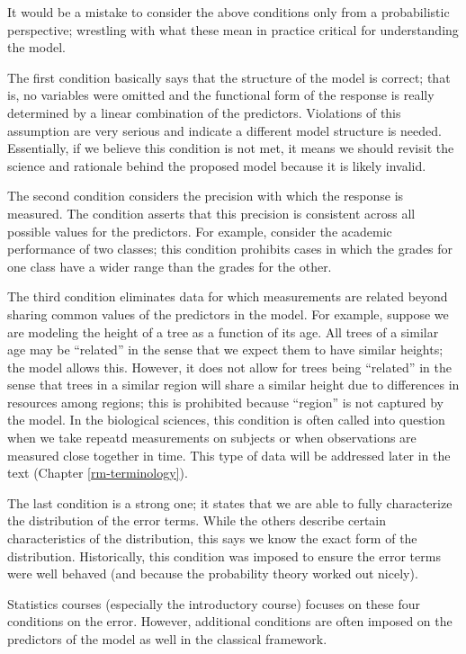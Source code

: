 \documentclass[
]{book}
\theoremstyle{plain}
\theoremstyle{mydefn}
\theoremstyle{myexmpl}
\theoremstyle{remark}
\begin{document}
It would be a mistake to consider the above conditions only from a probabilistic perspective; wrestling with what these mean in practice critical for understanding the model.

The first condition basically says that the structure of the model is correct; that is, no variables were omitted and the functional form of the response is really determined by a linear combination of the predictors. Violations of this assumption are very serious and indicate a different model structure is needed. Essentially, if we believe this condition is not met, it means we should revisit the science and rationale behind the proposed model because it is likely invalid.

The second condition considers the precision with which the response is measured. The condition asserts that this precision is consistent across all possible values for the predictors. For example, consider the academic performance of two classes; this condition prohibits cases in which the grades for one class have a wider range than the grades for the other.

The third condition eliminates data for which measurements are related beyond sharing common values of the predictors in the model. For example, suppose we are modeling the height of a tree as a function of its age. All trees of a similar age may be ``related'' in the sense that we expect them to have similar heights; the model allows this. However, it does not allow for trees being ``related'' in the sense that trees in a similar region will share a similar height due to differences in resources among regions; this is prohibited because ``region'' is not captured by the model. In the biological sciences, this condition is often called into question when we take repeatd measurements on subjects or when observations are measured close together in time. This type of data will be addressed later in the text (Chapter \ref{rm-terminology}).

The last condition is a strong one; it states that we are able to fully characterize the distribution of the error terms. While the others describe certain characteristics of the distribution, this says we know the exact form of the distribution. Historically, this condition was imposed to ensure the error terms were well behaved (and because the probability theory worked out nicely).

Statistics courses (especially the introductory course) focuses on these four conditions on the error. However, additional conditions are often imposed on the predictors of the model as well in the classical framework.
\end{document}
